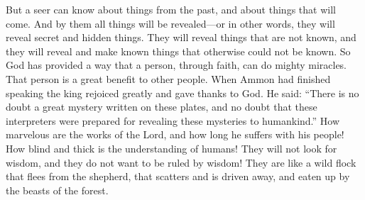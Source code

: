 But a seer can know about things from the past, and about things that will come. And by them all things will be revealed---or in other words, they will reveal secret and hidden things. They will reveal things that are not known, and they will reveal and make known things that otherwise could not be known.
\bverse \iffalse Thus God has provided a means that man, through faith, might work mighty miracles; therefore he becometh a great benefit to his fellow beings. \fi
So God has provided a way that a person, through faith, can do mighty miracles. That person is a great benefit to other people.
\bverse \iffalse And now, when Ammon had made an end of speaking these words the king rejoiced exceedingly, and gave thanks to God, saying: Doubtless a great mystery is contained within these plates, and these interpreters were doubtless prepared for the purpose of unfolding all such mysteries to the children of men. \fi
When Ammon had finished speaking the king rejoiced greatly and gave thanks to God. He said:  ``There is no doubt a great mystery written on these plates, and no doubt that these interpreters were prepared for revealing these mysteries to humankind.''
\bverse \iffalse O how marvelous are the works of the Lord, and how long doth he suffer with his people; yea, and how blind and impenetrable are the understandings of the children of men; for they will not seek wisdom, neither do they desire that she should rule over them! \fi
How marvelous are the works of the Lord, and how long he suffers with his people! How blind and thick is the understanding of humans! They will not look for wisdom, and they do not want to be ruled by wisdom!
\bverse \iffalse Yea, they are as a wild flock which fleeth from the shepherd, and scattereth, and are driven, and are devoured by the beasts of the forest. \fi
They are like a wild flock that flees from the shepherd, that scatters and is driven away, and eaten up by the beasts of the forest.

